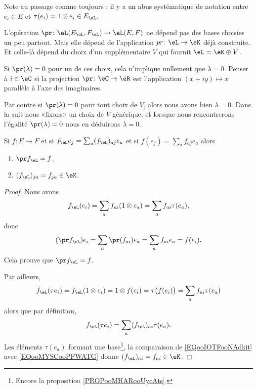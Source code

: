Note au passage comme toujours : il y a un abus systématique de notation entre \( e_i\in E\) et \( \tau(e_i)=1\otimes e_i\in E_{\eL}\).

\begin{remark}       \label{REMooBEXGooLgpHzg}
    L'opération \( \pr\colon \aL(E_{\eL},F_{\eL})\to \aL(E,F)\) ne dépend pas des bases choisies un peu partout. Mais elle dépend de l'application \( pr\colon \eL\to \eK\) déjà construite. Et celle-là dépend du choix d'un supplémentaire $V$ qui fournit \( \eL=\eK\oplus V\).

    Si \( \pr(\lambda)=0\) pour un de ces choix, cela n'implique nullement que \( \lambda=0\). Penser à \( i\in \eC\) si la projection \( \pr\colon \eC\to \eR\) est l'application \( (x+iy)\mapsto x\) parallèle à l'axe des imaginaires.

    Par contre si \( \pr(\lambda)=0\) pour tout choix de \( V\), alors nous avons bien \( \lambda=0\). Dans la suit nous «fixons» un choix de \( V\) générique, et lorsque nous rencontrerons l'égalité \( \pr(\lambda)=0\) nous en déduirons \( \lambda=0\).
\end{remark}

\begin{proposition} \label{PROPooPWDKooFNFWRI}
    Si \( f\colon E\to F\) et si \( f_{\eL}e_j=\sum_a(f_{\eL})_{aj}e_a\) et si \( f(e_j)=\sum_af_{aj}e_a\) alors
    \begin{enumerate}
        \item
            \( \pr f_{\eL}=f\),
        \item       \label{ITEMooNMPYooXosGhI}
            \( (f_{\eL})_{ja}=f_{ja} \in \eK\).
    \end{enumerate}
\end{proposition}

\begin{proof}
    Nous avons
    \begin{equation}
        f_{\eL}(e_i)=\sum_a f_{ai}(1\otimes e_a)=\sum_a f_{ai}\tau(e_a),
    \end{equation}
    donc
    \begin{equation}
        (\pr f_{\eL})e_i=\sum_a\pr(f_{ai})e_a=\sum_af_{ai}e_a=f(e_i).
    \end{equation}
    Cela prouve que \( \pr f_{\eL}=f\).

    Par ailleurs, 
    \begin{equation}        \label{EQooIOTFooNAdkit}
        f_{\eL}(\tau e_i)=f_{\eL}(1\otimes e_i)=1\otimes f(e_i)=\tau\big( f(e_i) \big)=\sum_af_{ai}\tau(e_a)
    \end{equation}
    alors que par définition,
    \begin{equation}        \label{EQooMYSCooPFWATG}
        f_{\eL}(\tau e_i)=\sum_a(f_{\eL})_{ai}\tau(e_a).
    \end{equation}
    Les éléments \( \tau(e_a)\) formant une base\footnote{Encore la proposition \ref{PROPooMHARooUycAts}.}, la comparaison de \eqref{EQooIOTFooNAdkit} avec \eqref{EQooMYSCooPFWATG} donne \( (f_{\eL})_{ai}=f_{ai}\in \eK\).
\end{proof}

